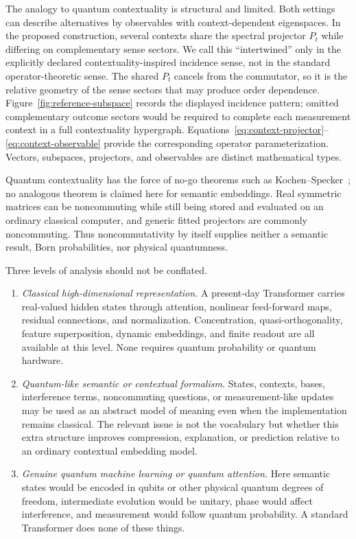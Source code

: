\documentclass[
  aps,
  reprint,
  superscriptaddress,
  floatfix,
  nofootinbib,
  longbibliography
]{revtex4-2}
\begin{document}
The analogy to quantum contextuality is structural and limited. Both settings
can describe alternatives by observables with context-dependent eigenspaces.
In the proposed construction, several contexts share the spectral projector
$P_t$ while differing on complementary sense sectors.  We call this
``intertwined'' only in the explicitly declared contextuality-inspired
incidence sense, not in the standard operator-theoretic sense.  The shared
$P_t$ cancels from the commutator, so it is the relative geometry of the sense
sectors that may produce order dependence.  Figure~\ref{fig:reference-subspace}
records the displayed incidence pattern; omitted complementary outcome sectors
would be required to complete each measurement context in a full contextuality
hypergraph.  Equations~\eqref{eq:context-projector}--
\eqref{eq:context-observable} provide the corresponding operator
parameterization.  Vectors, subspaces, projectors, and observables are distinct
mathematical types.

Quantum contextuality has the force of no-go theorems such as
Kochen--Specker~\cite{specker-60,kochen1}; no analogous theorem is claimed
here for semantic embeddings.  Real symmetric matrices can be noncommuting
while still being stored and evaluated on an ordinary classical computer, and
generic fitted projectors are commonly noncommuting.  Thus noncommutativity by
itself supplies neither a semantic result, Born probabilities, nor physical
quantumness.

Three levels of analysis should not be conflated.
%
\begin{enumerate}
\item \emph{Classical high-dimensional representation.}
A present-day Transformer carries real-valued hidden states through
attention, nonlinear feed-forward maps, residual connections, and
normalization.  Concentration, quasi-orthogonality, feature superposition,
dynamic embeddings, and finite readout are all available at this level.
None requires quantum probability or quantum hardware.

\item \emph{Quantum-like semantic or contextual formalism.}
States, contexts, bases, interference terms, noncommuting questions, or
measurement-like updates may be used as an abstract model of meaning even
when the implementation remains classical.  The relevant issue is not the
vocabulary but whether this extra structure improves compression,
explanation, or prediction relative to an ordinary contextual embedding
model.

\item \emph{Genuine quantum machine learning or quantum attention.}
Here semantic states would be encoded in qubits or other physical quantum
degrees of freedom, intermediate evolution would be unitary, phase would
affect interference, and measurement would follow quantum probability.  A
standard Transformer does none of these things.
\end{enumerate}
%
\end{document}
